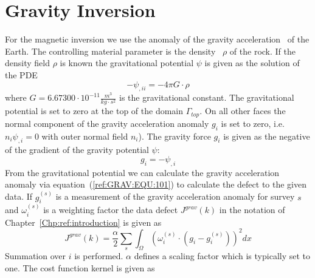 
%
%
%

\section{Gravity Inversion}\label{sec:forward gravity}
For the magnetic inversion we use the anomaly of the gravity acceleration~ of the Earth.
The controlling material parameter
is the density~ $\rho$ of the rock. 
If the density field $\rho$ is known the gravitational potential $\psi$ is given
as the solution of the PDE 
\begin{equation}\label{ref:GRAV:EQU:100}
-\psi_{,ii} = -4\pi G \cdot  \rho
\end{equation}
where $G=6.67300 \cdot 10^{-11}  \frac{m^3}{kg \cdot s^2}$ is the gravitational constant.  The gravitational potential is set to zero 
at the top of the domain $\Gamma_{top}$. On all other faces the normal component of the gravity acceleration anomaly $g_i$
is set to zero, i.e. $n_i \psi_{,i}  = 0$ with outer normal field $n_i$).
The gravity force $g_i$ is given
as the negative of the gradient of the gravity potential $\psi$:
\begin{equation}\label{ref:GRAV:EQU:101}
 g_i = - \psi_{,i} 
\end{equation} 
From the gravitational potential we can calculate the gravity acceleration anomaly via equation~(\ref{ref:GRAV:EQU:101}) to
calculate the defect to the given data. If $g^{(s)}_i$ is a measurement of the gravity acceleration anomaly for 
survey $s$ and $\omega^{(s)}_i$ is a weighting factor the data defect $J^{grav}(k)$ in the notation of Chapter~\ref{Chp:ref:introduction}
is given as
\begin{equation}\label{ref:GRAV:EQU:9}
J^{grav}(k) = \frac{\alpha}{2}\sum_{s} \int_{\Omega} ( \omega^{(s)}_i \cdot (g_{i}- g^{(s)}_i) ) ^2 dx
\end{equation} 
Summation over $i$ is performed. $\alpha$ defines a scaling factor which is typically set to one.
The cost function kernel is given as
